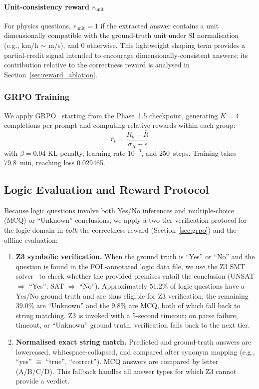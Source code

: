 \documentclass[cmc,journal,article,submit,moreauthors,pdftex]{Definitions/tsp}
\begin{document}
\paragraph{Unit-consistency reward $r_{\text{unit}}$}
For physics questions, $r_{\text{unit}} = 1$ if the extracted answer
contains a unit dimensionally compatible with the ground-truth unit
under SI normalisation (e.g., km/h $\sim$ m/s), and 0 otherwise.
This lightweight shaping term provides a partial-credit signal intended
to encourage dimensionally-consistent answers; its contribution relative
to the correctness reward is analysed in Section~\ref{sec:reward_ablation}.

\subsubsection{GRPO Training}

We apply GRPO~\cite{Shao2024} starting from the Phase~1.5 checkpoint,
generating $K=4$ completions per prompt and computing relative rewards
within each group:
\begin{equation}
  \hat{r}_k = \frac{R_k - \bar{R}}{\sigma_R + \epsilon}
  \tag{5}
\end{equation}
with $\beta = 0.04$ KL penalty, learning rate $10^{-6}$, and 250~steps.
Training takes 79.8~min, reaching loss 0.029465.

\subsection{Logic Evaluation and Reward Protocol}\label{sec:logic_protocol}

Because logic questions involve both Yes/No inferences and multiple-choice
(MCQ) or ``Unknown'' conclusions, we apply a two-tier verification protocol
for the logic domain in \emph{both} the correctness reward
(Section~\ref{sec:grpo})
and the offline evaluation:

\begin{enumerate}
  \item \textbf{Z3 symbolic verification.} When the ground truth is
        ``Yes'' or ``No'' and the question is found in the FOL-annotated
        logic data file, we use the Z3 SMT solver~\cite{Pan2023} to check
        whether the provided premises entail the conclusion
        (UNSAT $\Rightarrow$ ``Yes''; SAT $\Rightarrow$ ``No'').
        Approximately 51.2\% of logic questions have a Yes/No ground truth
        and are thus eligible for Z3 verification; the remaining 39.0\%
        are ``Unknown'' and the 9.8\% are MCQ, both of which fall back
        to string matching.
        Z3 is invoked with a 5-second timeout; on parse failure,
        timeout, or ``Unknown'' ground truth, verification falls back to
        the next tier.

  \item \textbf{Normalised exact string match.} Predicted and ground-truth
        answers are lowercased, whitespace-collapsed, and compared after
        synonym mapping (e.g., ``yes'' $\equiv$ ``true'', ``correct'').
        MCQ answers are compared by letter (A/B/C/D).
        This fallback handles all answer types for which Z3 cannot
        provide a verdict.
\end{enumerate}
\end{document}
